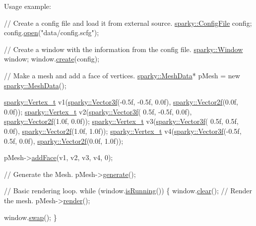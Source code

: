 Usage example\+: 
\begin{DoxyCode}
\textcolor{comment}{// Create a config file and load it from external source.}
\hyperlink{classsparky_1_1_config_file}{sparky::ConfigFile} config;
config.\hyperlink{classsparky_1_1_config_file_a81085ec4e85214d68123aba52071b781}{open}(\textcolor{stringliteral}{"data/config.scfg"});

\textcolor{comment}{// Create a window with the information from the config file.}
\hyperlink{classsparky_1_1_window}{sparky::Window} window;
window.\hyperlink{classsparky_1_1_window_a146a77df577c6ca3e441a3c7f9bc2cbd}{create}(config);

\textcolor{comment}{// Make a mesh and add a face of vertices.}
\hyperlink{classsparky_1_1_mesh_data}{sparky::MeshData}* pMesh = \textcolor{keyword}{new} \hyperlink{classsparky_1_1_mesh_data}{sparky::MeshData}();

\hyperlink{structsparky_1_1_vertex__t}{sparky::Vertex\_t} v1(\hyperlink{classsparky_1_1_vector3}{sparky::Vector3f}(-0.5f, -0.5f, 0.0f), 
      \hyperlink{classsparky_1_1_vector2}{sparky::Vector2f}(0.0f, 0.0f));
\hyperlink{structsparky_1_1_vertex__t}{sparky::Vertex\_t} v2(\hyperlink{classsparky_1_1_vector3}{sparky::Vector3f}( 0.5f, -0.5f, 0.0f), 
      \hyperlink{classsparky_1_1_vector2}{sparky::Vector2f}(1.0f, 0.0f));
\hyperlink{structsparky_1_1_vertex__t}{sparky::Vertex\_t} v3(\hyperlink{classsparky_1_1_vector3}{sparky::Vector3f}( 0.5f,  0.5f, 0.0f), 
      \hyperlink{classsparky_1_1_vector2}{sparky::Vector2f}(1.0f, 1.0f));
\hyperlink{structsparky_1_1_vertex__t}{sparky::Vertex\_t} v4(\hyperlink{classsparky_1_1_vector3}{sparky::Vector3f}(-0.5f,  0.5f, 0.0f), 
      \hyperlink{classsparky_1_1_vector2}{sparky::Vector2f}(0.0f, 1.0f));

pMesh->\hyperlink{classsparky_1_1_i_mesh_component_a3b35df5332c7474b730036acfa71ab9e}{addFace}(v1, v2, v3, v4, 0);

\textcolor{comment}{// Generate the Mesh.}
pMesh->\hyperlink{classsparky_1_1_i_mesh_component_abad2c646e2303e5f69d1fc5efcb7f2c7}{generate}();

\textcolor{comment}{// Basic rendering loop.}
\textcolor{keywordflow}{while} (window.\hyperlink{classsparky_1_1_window_a3ed4cf733081b4bbc147b5d5808adaac}{isRunning}())
\{
    window.\hyperlink{classsparky_1_1_window_a92cf43e19d310fea158098d8eb01c590}{clear}();
    \textcolor{comment}{// Render the mesh.}
    pMesh->\hyperlink{classsparky_1_1_mesh_data_a38c127564baa1fb1f3e690d5afe3246c}{render}();

    window.\hyperlink{classsparky_1_1_window_a155728f06dbc5742250649e3ec8fc779}{swap}();
\}
\end{DoxyCode}
 

